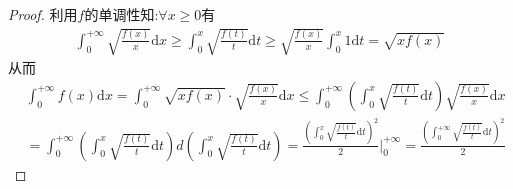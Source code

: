 \documentclass[../../main.tex]{subfiles}%
\begin{document}
\begin{proof}
利用$f$的单调性知:$\forall x \geqslant 0$有
\begin{equation}
\begin{split}
\int_0^{+\infty}{\sqrt{\frac{f(x)}{x}}\mathrm{d}x}\geqslant \int_0^x{\sqrt{\frac{f(t)}{t}}\mathrm{d}t}\geqslant \sqrt{\frac{f(x)}{x}}\int_0^x{1\mathrm{d}t}=\sqrt{xf\left( x \right)}
\end{split}
\nonumber
\end{equation}
从而
\begin{equation}
\begin{split}
&\int_0^{+\infty}{f\left( x \right) \mathrm{d}x=}\int_0^{+\infty}{\sqrt{xf\left( x \right)}\cdot \sqrt{\frac{f\left( x \right)}{x}}\mathrm{d}x}\leqslant \int_0^{+\infty}{\left( \int_0^x{\sqrt{\frac{f\left( t \right)}{t}}\mathrm{d}t} \right) \sqrt{\frac{f\left( x \right)}{x}}\mathrm{d}x}
\\
&=\int_0^{+\infty}{\left( \int_0^x{\sqrt{\frac{f\left( t \right)}{t}}\mathrm{d}t} \right) d\left( \int_0^x{\sqrt{\frac{f\left( t \right)}{t}}\mathrm{d}t} \right)}=\frac{\left( \int_0^x{\sqrt{\frac{f\left( t \right)}{t}}\mathrm{d}t} \right) ^2}{2}\Bigg|_{0}^{+\infty}=\frac{\left( \int_0^{+\infty}{\sqrt{\frac{f\left( t \right)}{t}}\mathrm{d}t} \right) ^2}{2}
\end{split}
\nonumber
\end{equation}\end{proof}
\end{document}

